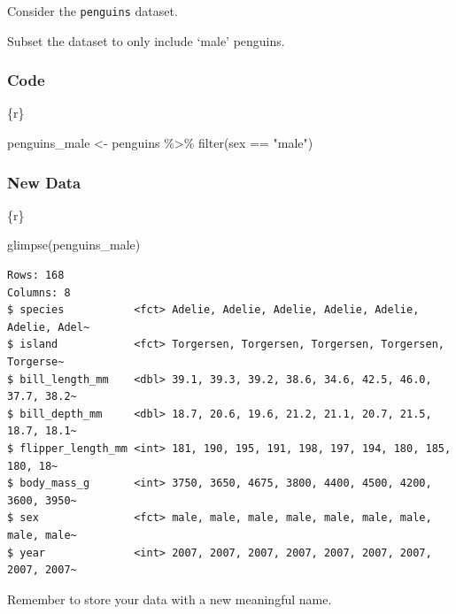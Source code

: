 \documentclass[
  letterpaper,
  DIV=11,
  numbers=noendperiod]{scrreprt}
\newenvironment{Shaded}{\begin{snugshade}}{\end{snugshade}}
\newcommand{\FunctionTok}[1]{\textcolor[rgb]{0.28,0.35,0.67}{#1}}
\newcommand{\InformationTok}[1]{\textcolor[rgb]{0.37,0.37,0.37}{#1}}
\newcommand{\NormalTok}[1]{\textcolor[rgb]{0.00,0.23,0.31}{#1}}
\newcommand{\OtherTok}[1]{\textcolor[rgb]{0.00,0.23,0.31}{#1}}
\newcommand{\SpecialCharTok}[1]{\textcolor[rgb]{0.37,0.37,0.37}{#1}}
\newcommand{\StringTok}[1]{\textcolor[rgb]{0.13,0.47,0.30}{#1}}
\begin{document}
\begin{tcolorbox}[enhanced jigsaw, colframe=quarto-callout-note-color-frame, breakable, colback=white, toprule=.15mm, leftrule=.75mm, left=2mm, opacityback=0, rightrule=.15mm, arc=.35mm, bottomrule=.15mm]
Consider the \texttt{penguins} dataset.

Subset the dataset to only include `male' penguins.

\hypertarget{code-3}{%
\subsubsection*{Code}\label{code-3}}

\begin{Shaded}
\begin{Highlighting}[]
\InformationTok{\textasciigrave{}\textasciigrave{}\textasciigrave{}\{r\}}

\NormalTok{penguins\_male }\OtherTok{\textless{}{-}}\NormalTok{ penguins }\SpecialCharTok{\%\textgreater{}\%} 
  \FunctionTok{filter}\NormalTok{(sex }\SpecialCharTok{==} \StringTok{"male"}\NormalTok{)}
\InformationTok{\textasciigrave{}\textasciigrave{}\textasciigrave{}}
\end{Highlighting}
\end{Shaded}

\hypertarget{new-data}{%
\subsubsection*{New Data}\label{new-data}}

\begin{Shaded}
\begin{Highlighting}[]
\InformationTok{\textasciigrave{}\textasciigrave{}\textasciigrave{}\{r\}}

\FunctionTok{glimpse}\NormalTok{(penguins\_male)}
\InformationTok{\textasciigrave{}\textasciigrave{}\textasciigrave{}}
\end{Highlighting}
\end{Shaded}

\begin{verbatim}
Rows: 168
Columns: 8
$ species           <fct> Adelie, Adelie, Adelie, Adelie, Adelie, Adelie, Adel~
$ island            <fct> Torgersen, Torgersen, Torgersen, Torgersen, Torgerse~
$ bill_length_mm    <dbl> 39.1, 39.3, 39.2, 38.6, 34.6, 42.5, 46.0, 37.7, 38.2~
$ bill_depth_mm     <dbl> 18.7, 20.6, 19.6, 21.2, 21.1, 20.7, 21.5, 18.7, 18.1~
$ flipper_length_mm <int> 181, 190, 195, 191, 198, 197, 194, 180, 185, 180, 18~
$ body_mass_g       <int> 3750, 3650, 4675, 3800, 4400, 4500, 4200, 3600, 3950~
$ sex               <fct> male, male, male, male, male, male, male, male, male~
$ year              <int> 2007, 2007, 2007, 2007, 2007, 2007, 2007, 2007, 2007~
\end{verbatim}

Remember to store your data with a new meaningful name.
\end{tcolorbox}
\end{document}
